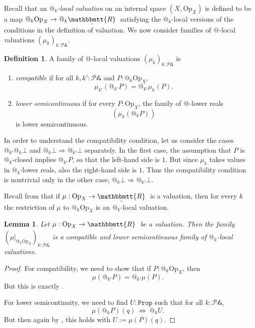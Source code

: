 \documentclass[11pt, oneside, article]{memoir}
\makeatletter
\theoremstyle{plain}
\newtheorem{lemma}[theorem]{Lemma}
\theoremstyle{definition}
\newtheorem{definition}[theorem]{Definition}
\theoremstyle{remark}
\newcommand{\const}[1]{\mathtt{#1}}
\newcommand{\Set}[1]{\mathrm{#1}}
\newcommand{\ubar}[1]{\underaccent{\bar}{#1}}
\newcommand{\internal}[1]{\raisebox{-.03ex}{$\mathbbmtt{#1}$}}
\newcommand{\hs}{\hspace{1.1pt}}
\newcommand{\trr}{\internal{R}\hs}
\newcommand{\tlrr}{\ubar{\trr}\hs}
\newcommand{\prop}{\const{Prop}}
\newcommand{\Op}{\Set{Op}}
\newcommand{\pt}{k}				%
\newcommand{\Pts}{\mathcal{Pts}}		%
\newcommand{\AtSymbol}{{@}}
\newcommand{\At}[1][\pt]{\AtSymbol_{#1}}
\newcommand{\imp}{\Rightarrow}
\makeatother
\begin{document}
Recall that an \emph{$\At$-local valuation} on an internal space $(X,\Op_X)$ is defined to be a map $\At \Op_X \to \At \tlrr$ satisfying the $\At$-local versions of the conditions in the definition of valuation. We now consider families of $\At[]$-local valuations $(\mu_\pt)_{\pt : \Pts}$.

\begin{definition}
	A family of $\At[]$-local valuations $(\mu_\pt)_{\pt : \Pts}$ is
	\begin{enumerate}
		\item \emph{compatible} if for all $\pt, \pt' : \Pts$ and $P : \At \Op_X$,
			\[
				\mu_{\pt'}(\At[\pt'] P) = \At[\pt'] \mu_\pt(P).
			\]
		\item \emph{lower semicontinuous} if for every $P : \Op_X$, the family of $\At[]$-lower reals
			\[
				\left( \mu_\pt(\At P) \right)
			\]
			is lower semicontinuous.
	\end{enumerate}
\end{definition}

In order to understand the compatibility condition, let us consider the cases $\At[\pt'] \At \bot$ and $\At \bot \imp \At[\pt'] \bot$ separately. In the first case, the assumption that $P$ is $\At$-closed implies $\At[\pt'] P$, so that the left-hand side is $1$. But since $\mu_\pt$ takes values in $\At$-lower reals, also the right-hand side is $1$. Thus the compatibility condition is nontrivial only in the other case, $\At \bot \imp \At[\pt'] \bot$.

Recall from  that if $\mu : \Op_X \to \tlrr$ is a valuation, then for every $\pt$ the restriction of $\mu$ to $\At \Op_X$ is an $\At$-local valuation. 

\begin{lemma}
	Let $\mu : \Op_X \to \tlrr$ be a valuation. Then the family $\left( \mu|_{\At \Op_X} \right)_{\pt : \Pts}$ is a compatible and lower semicontinuous family of $\At$-local valuations.
\end{lemma}

\begin{proof}
	For compatibility, we need to show that if $P : \At \Op_X$, then
	\[
		\mu( \At[\pt'] P ) = \At[\pt'] \mu(P).
	\]
	But this is exactly .

	For lower semicontinuity, we need to find $U : \prop$ such that for all $\pt : \Pts$,
	\[
		\mu(\At P)(q) \: \Leftrightarrow \: \At U.
	\]
	But then again by , this holds with $U := \mu(P)(q)$.
\end{proof}
\end{document}
